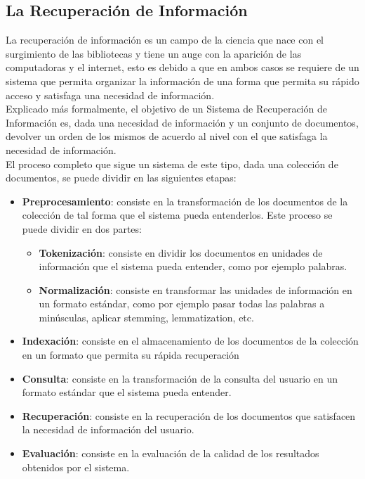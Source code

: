 \documentclass[12pt]{article}
\begin{document}
\subsection{La Recuperación de Información}
La recuperación de información es un campo de la ciencia que nace con el surgimiento
de las bibliotecas y tiene un auge con la aparición de las computadoras y el internet, esto es debido
a que en ambos casos se requiere de un sistema que permita organizar la información de una forma
que permita su rápido acceso y satisfaga una necesidad de información.\\
Explicado más formalmente, el objetivo de un Sistema de Recuperación de Información es, dada una necesidad
de información y un conjunto de documentos, devolver un orden de los mismos de acuerdo al nivel
con el que satisfaga la necesidad de información.\\
El proceso completo que sigue un sistema de este tipo, dada una colección de documentos,
se puede dividir en las siguientes etapas:
\begin{itemize}
	\item \textbf{Preprocesamiento}: consiste en la transformación de los documentos de la colección
	      de tal forma que el sistema pueda entenderlos. Este proceso se puede dividir en dos partes:
	      \begin{itemize}
		      \item \textbf{Tokenización}: consiste en dividir los documentos en unidades de información
		            que el sistema pueda entender, como por ejemplo palabras.
		      \item \textbf{Normalización}: consiste en transformar las unidades de información en un formato
		            estándar, como por ejemplo pasar todas las palabras a minúsculas, aplicar stemming,
		            lemmatization, etc.
	      \end{itemize}
	\item \textbf{Indexación}: consiste en el almacenamiento de los documentos de la colección en un
	      formato que permita su rápida recuperación
	\item \textbf{Consulta}: consiste en la transformación de la consulta del usuario en un formato
	      estándar que el sistema pueda entender.
	\item \textbf{Recuperación}: consiste en la recuperación de los documentos que satisfacen la
	      necesidad de información del usuario.
	\item \textbf{Evaluación}: consiste en la evaluación de la calidad de los resultados obtenidos
	      por el sistema.
\end{itemize}
\end{document}
